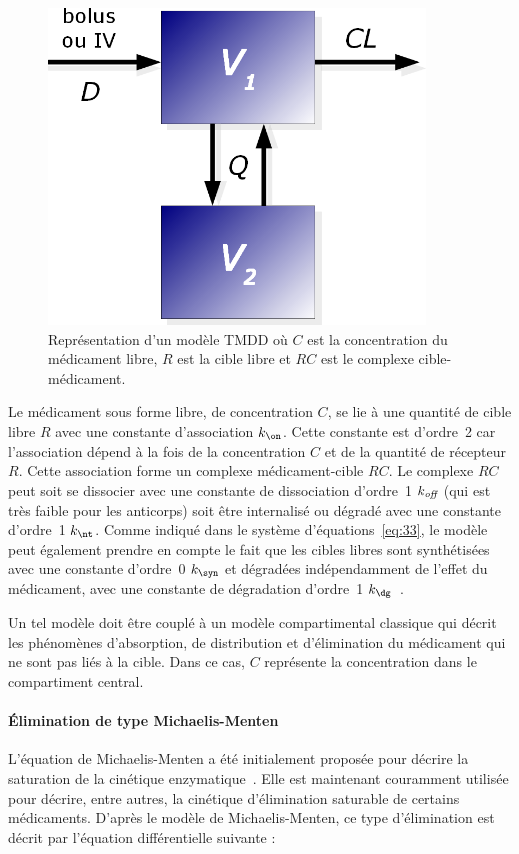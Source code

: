 \begin{figure}[htbp]
	\centering
		\includegraphics[width=10cm]{figures/raster/FIG_5}
	\caption[Représentation d'un modèle TMDD]{Représentation d'un modèle TMDD où $C$ est la concentration du médicament libre, $R$ est la cible libre et $RC$ est le complexe cible-médicament.}
	\label{fig:6}
\end{figure}

Le médicament sous forme libre, de concentration $C$, se lie à une quantité de cible libre $R$ avec une constante d'association $k_{\on}$. Cette constante est d'ordre~2 car l'association dépend à la fois de la concentration $C$ et de la quantité de récepteur $R$. Cette association forme un complexe médicament-cible $RC$. Le complexe $RC$ peut soit se dissocier avec une constante de dissociation d'ordre~1 $k_{\operatorname{\textit{off}}}$ (qui est très faible pour les anticorps) soit être internalisé ou dégradé avec une constante d'ordre~1 $k_{\nt}$. Comme indiqué dans le système d'équations~\ref{eq:33}, le modèle peut également prendre en compte le fait que les cibles libres sont synthétisées avec une constante d'ordre~0 $k_{\syn}$ et dégradées indépendamment de l'effet du médicament, avec une constante de dégradation d'ordre~1 $k_{\dg}$~\citep{REF3}.

Un tel modèle doit être couplé à un modèle compartimental classique qui décrit les phénomènes d'absorption, de distribution et d'élimination du médicament qui ne sont pas liés à la cible. Dans ce cas, $C$ représente la concentration dans le compartiment central.

\paragraph{Élimination de type Michaelis-Menten} L'équation de Michaelis-Menten a été initialement proposée pour décrire la saturation de la cinétique enzymatique~\citep{REF5}. Elle est maintenant couramment utilisée pour décrire, entre autres, la cinétique d'élimination saturable de certains médicaments. D'après le modèle de Michaelis-Menten, ce type d'élimination est décrit par l'équation différentielle suivante :

